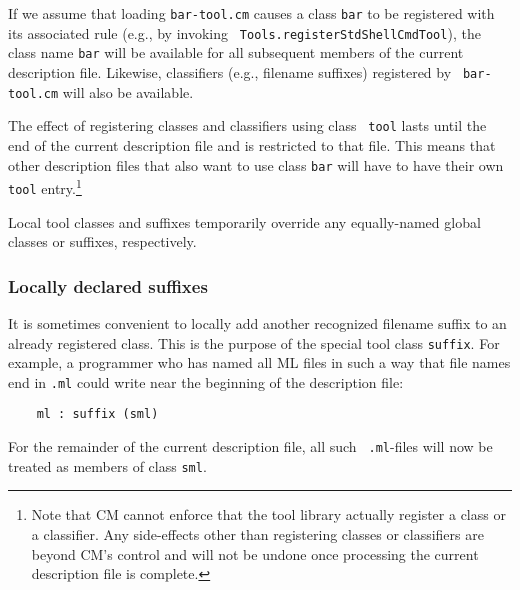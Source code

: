 If we assume that loading {\tt bar-tool.cm} causes a class {\tt bar}
to be registered with its associated rule (e.g., by invoking {\tt
Tools.registerStdShellCmdTool}), the class name {\tt bar} will be
available for all subsequent members of the current description file.
Likewise, classifiers (e.g., filename suffixes) registered by {\tt
bar-tool.cm} will also be available.

The effect of registering classes and classifiers using class {\tt
tool} lasts until the end of the current description file and is
restricted to that file.  This means that other description files that
also want to use class {\tt bar} will have to have their own {\tt
tool} entry.\footnote{Note that CM cannot enforce that the tool
library actually register a class or a classifier.  Any side-effects
other than registering classes or classifiers are beyond CM's control
and will not be undone once processing the current description file is
complete.}

Local tool classes and suffixes temporarily override any equally-named
global classes or suffixes, respectively.

\subsubsection{Locally declared suffixes}
\label{sec:localsuffixes}

It is sometimes convenient to locally add another recognized filename
suffix to an already registered class.  This is the purpose of the
special tool class {\tt suffix}.  For example, a programmer who has
named all ML files in such a way that file names end in {\tt .ml}
could write near the beginning of the description file:

\begin{verbatim}
    ml : suffix (sml)
\end{verbatim}

For the remainder of the current description file, all such {\tt
.ml}-files will now be treated as members of class {\tt sml}.
